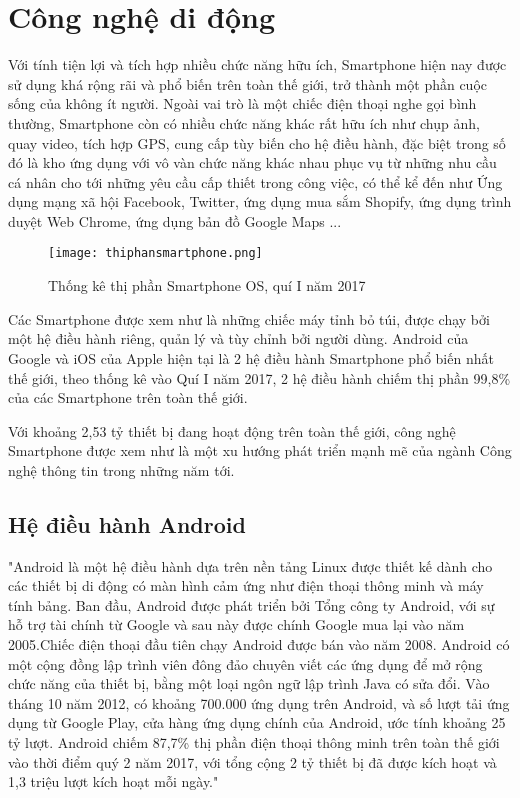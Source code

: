 \documentclass[../thesis.tex]{subfiles}
\begin{document}
\section{Công nghệ di động}
	
	Với tính tiện lợi và tích hợp nhiều chức năng hữu ích, Smartphone hiện nay được sử dụng khá rộng rãi và phổ biến trên toàn thế giới, trở thành một phần cuộc sống của không ít người. Ngoài vai trò là một chiếc điện thoại nghe gọi bình thường, Smartphone còn có nhiều chức năng khác rất hữu ích như chụp ảnh, quay video, tích hợp GPS, cung cấp tùy biến cho hệ điều hành, đặc biệt trong số đó là kho ứng dụng với vô vàn chức năng khác nhau phục vụ từ những nhu cầu cá nhân cho tới những yêu cầu cấp thiết trong công việc, có thể kể đến như Ứng dụng mạng xã hội Facebook, Twitter, ứng dụng mua sắm Shopify, ứng dụng trình duyệt Web Chrome, ứng dụng bản đồ Google Maps ...
	
	\begin{figure}[ht!]
		\centering
		\texttt{[image: thiphansmartphone.png]}
		\caption{Thống kê thị phần Smartphone OS, quí I năm 2017}
		\cite{android:thongke_thiphansmartphone}
		\label{fig:thongke_thiphan}
	\end{figure}
	
	Các Smartphone được xem như là những chiếc máy tỉnh bỏ túi, được chạy bởi một hệ điều hành riêng, quản lý và tùy chỉnh bởi người dùng. Android của Google và iOS của Apple hiện tại là 2 hệ điều hành Smartphone phổ biến nhất thế giới, theo thống kê vào Quí I năm 2017, 2 hệ điều hành chiếm thị phần 99,8\% của các Smartphone trên toàn thế giới.
	
	Với khoảng 2,53 tỷ thiết bị đang hoạt động trên toàn thế giới\cite{android:thongke_ngdungsmartphone}, công nghệ Smartphone được xem như là một xu hướng phát triển mạnh mẽ của ngành Công nghệ thông tin trong những năm tới.
	
	\subsection{Hệ điều hành Android}
	"Android là một hệ điều hành dựa trên nền tảng Linux được thiết kế dành cho các thiết bị di động có màn hình cảm ứng như điện thoại thông minh và máy tính bảng. Ban đầu, Android được phát triển bởi Tổng công ty Android, với sự hỗ trợ tài chính từ Google và sau này được chính Google mua lại vào năm 2005.Chiếc điện thoại đầu tiên chạy Android được bán vào năm 2008. Android có một cộng đồng lập trình viên đông đảo chuyên viết các ứng dụng để mở rộng chức năng của thiết bị, bằng một loại ngôn ngữ lập trình Java có sửa đổi. Vào tháng 10 năm 2012, có khoảng 700.000 ứng dụng trên Android, và số lượt tải ứng dụng từ Google Play, cửa hàng ứng dụng chính của Android, ước tính khoảng 25 tỷ lượt. Android chiếm 87,7\% thị phần điện thoại thông minh trên toàn thế giới vào thời điểm quý 2 năm 2017, với tổng cộng 2 tỷ thiết bị đã được kích hoạt và 1,3 triệu lượt kích hoạt mỗi ngày."\cite{wiki:android}
	
\end{document}
